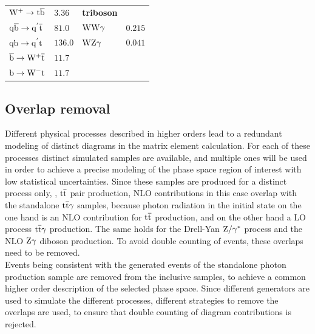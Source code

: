 \begin{table}[tbp]
\begin{tabular}[width=\textwidth]{ll|ll}
  $\mathrm{W^+}\to\mathrm{t}\overline{\mathrm{b}}$                             & $3.36$                               & \textbf{triboson}                            &                                      \\
  $\mathrm{q}\overline{\mathrm{b}}\to\mathrm{q}^{'}\overline{\mathrm{t}}$                    & $81.0$                               & $\mathrm{W}\mathrm{W}\gamma$                                 & $0.215$                              \\
  $\mathrm{q}\mathrm{b}\to\mathrm{q}^{'}\mathrm{t}$                      & $136.0$                              & $\mathrm{W}\mathrm{Z}\gamma$                                 & $0.041$                              \\
  $\overline{\mathrm{b}}\to\mathrm{W^+}\overline{\mathrm{t}}$                            & $11.7$                               &                                              &                                      \\
  $\mathrm{b}\to\mathrm{W^-}\mathrm{t}$                              & $11.7$                               &                                              &                                      \\
  \hline
 \end{tabular}
\end{table}

\subsection*{Overlap removal}\label{sec:overlap}

Different physical processes described in higher orders lead to a redundant modeling of distinct diagrams in the matrix element calculation. For each of these processes distinct simulated samples are available, and multiple ones will be used in order to achieve a precise modeling of the phase space region of interest with low statistical uncertainties. Since these samples are produced for a distinct process only, \eg, ${\mathrm{t}\overline{\mathrm{t}}}$ pair production, NLO contributions in this case overlap with the standalone ${\mathrm{t}\overline{\mathrm{t}}}\gamma$ samples, because photon radiation in the initial state on the one hand is an NLO contribution for ${\mathrm{t}\overline{\mathrm{t}}}$ production, and on the other hand a LO process  ${\mathrm{t}\overline{\mathrm{t}}}\gamma$ production. The same holds for the Drell-Yan $\mathrm{Z}/\gamma^{*}$ process and the NLO $\mathrm{Z}\gamma$ diboson production. To avoid double counting of events, these overlaps need to be removed.\\
Events being consistent with the generated events of the standalone photon production sample are removed from the inclusive samples, to achieve a common higher order description of the selected phase space. Since different generators are used to simulate the different processes, different strategies to remove the overlaps are used, to ensure that double counting of diagram contributions is rejected.


